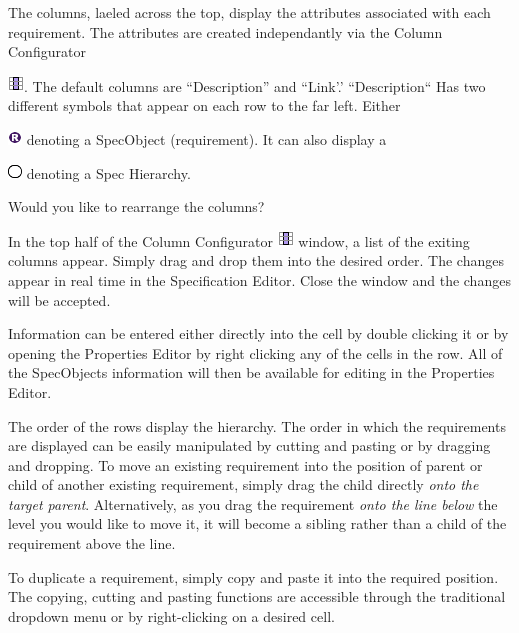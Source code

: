 The columns, laeled across the top, display the attributes associated with each requirement. The attributes are created independantly via the Column Configurator {\includegraphics[scale=0.6]{../rmf-images/icons/full/obj16/Column.png}. The default columns are ``Description'' and ``Link'.' ``Description`` Has two different symbols that appear on each row to the far left. Either {\includegraphics[scale=1]{../rmf-images/icons/full/obj16/requirement.png} denoting a SpecObject (requirement). It can also display a {\includegraphics[scale=1]{../rmf-images/icons/full/obj16/spechierarchy.png} denoting a Spec Hierarchy. 

\begin{info}
Would you like to rearrange the columns?

In the top half of the Column Configurator {\includegraphics[scale=0.6]{../rmf-images/icons/full/obj16/Column.png}} window, a list of the exiting columns appear. Simply drag and drop them into the desired order. The changes appear in real time in the Specification Editor. Close the window and the changes will be accepted.
\end{info}

Information can be entered either directly into the cell by double clicking it or by opening the Properties Editor by right clicking any of the cells in the row. All of the SpecObjects information will then be available for editing in the Properties Editor.

The order of the rows display the hierarchy. The order in which the requirements are displayed can be easily manipulated by cutting and pasting or by dragging and dropping. To move an existing requirement into the position of parent or child of another existing requirement, simply drag the child directly \textit{onto the target parent}. Alternatively, as you drag the requirement \textit{onto the line below} the level you would like to move it, it will become a sibling rather than a child of the requirement above the line.

To duplicate a requirement, simply copy and paste it into the required position. The copying, cutting and pasting functions are accessible through the traditional dropdown menu or by right-clicking on a desired cell.

}}}
